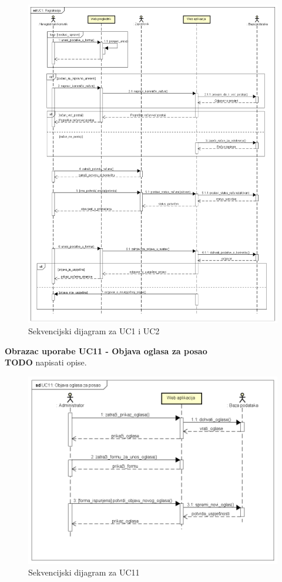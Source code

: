 \begin{figure}[H]
	\includegraphics[width=.9\linewidth]{slike/UC1_Registracija.png}
	\caption{Sekvencijski dijagram za UC1 i UC2}
	\label{fig:skvDReg}
\end{figure}
\eject

\textbf{Obrazac uporabe UC11 - Objava oglasa za posao} \\

\textbf{TODO} napisati opise.


\begin{figure}[H]
	\includegraphics[width=.9\linewidth]{slike/UC11_Objava_oglasa_za_posao.png}
	\caption{Sekvencijski dijagram za UC11}
	\label{fig:skvDOglas}
\end{figure}
\eject

